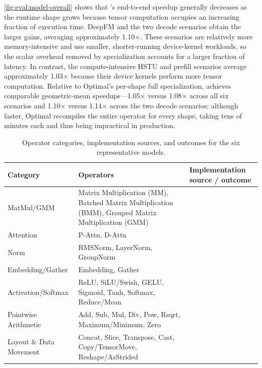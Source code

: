 \autoref{fig:eval:model-overall} shows that \mysys's end-to-end speedup generally decreases as the runtime shape grows because tensor computation occupies an increasing fraction of execution time. DeepFM and the two decode scenarios obtain the larger gains, averaging approximately 1.10$\times$. These scenarios are relatively more memory-intensive and use smaller, shorter-running device-kernel workloads, so the scalar overhead removed by specialization accounts for a larger fraction of latency. In contrast, the compute-intensive HSTU and prefill scenarios average approximately 1.03$\times$ because their device kernels perform more tensor computation. Relative to Optimal's per-shape full specialization, \mysys achieves comparable geometric-mean speedups---1.05$\times$ versus 1.08$\times$ across all six scenarios and 1.10$\times$ versus 1.14$\times$ across the two decode scenarios; although faster, Optimal recompiles the entire operator for every shape, taking tens of minutes each and thus being impractical in production.

\begin{table}[H]
	\caption{Operator categories, implementation sources, and \mysys outcomes for the six representative models.}
	\label{tab:eval:model-operator-categories}
	\centering
	\scriptsize
	\setlength{\tabcolsep}{3pt}
	\renewcommand{\arraystretch}{0.88}
	\begin{tabularx}{\columnwidth}{@{}l>{\raggedright\arraybackslash}Xl@{}}
		\toprule
		\textbf{Category} & \textbf{Operators} & \textbf{Implementation source / outcome} \\
		\midrule
		MatMul/GMM &
		Matrix Multiplication (MM), Batched Matrix Multiplication (BMM), Grouped Matrix Multiplication (GMM) &
		 \\
		Attention & P-Attn, D-Attn & \\
		Norm & RMSNorm, LayerNorm, GroupNorm & \\
		\midrule
		Embedding/Gather & Embedding, Gather &
		 \\
		Activation/Softmax & ReLU, SiLU/Swish, GELU, Sigmoid, Tanh, Softmax, Reduce/Mean & \\
		Pointwise Arithmetic & Add, Sub, Mul, Div, Pow, Rsqrt, Maximum/Minimum, Zero & \\
		Layout \& Data Movement & Concat, Slice, Transpose, Cast, Copy/TensorMove, Reshape/AsStrided & \\
		\bottomrule
	\end{tabularx}
	\vspace{-6pt}
\end{table}

